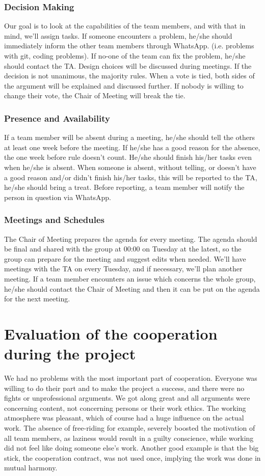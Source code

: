 \subsubsection{Decision Making}
Our goal is to look at the capabilities of the team members, and with that in mind, we'll assign tasks. If someone encounters a problem, he/she should immediately inform the other team members through WhatsApp. (i.e. problems with git, coding problems). If no-one of the team can fix the problem, he/she should contact the TA. Design choices will be discussed during meetings. If the decision is not unanimous, the majority rules. When a vote is tied, both sides of the argument will be explained and discussed further. If nobody is willing to change their vote, the Chair of Meeting will break the tie.

\subsubsection{Presence and Availability}
If a team member will be absent during a meeting, he/she should tell the others at least one week before the meeting. If he/she has a good reason for the absence, the one week before rule doesn't count. He/she should finish his/her tasks even when he/she is absent. When someone is absent, without telling, or doesn't have a good reason and/or didn't finish his/her tasks, this will be reported to the TA, he/she should bring a treat. Before reporting, a team member will notify the person in question via WhatsApp.
\subsubsection{Meetings and Schedules}
The Chair of Meeting prepares the agenda for every meeting.
The agenda should be final and shared with the group at 00:00 on Tuesday at the latest, so the group can prepare for the meeting and suggest edits when needed.
We'll have meetings with the TA on every Tuesday, and if necessary, we'll plan another meeting. If a team member encounters an issue which concerns the whole group, he/she should contact the Chair of Meeting and then it can be put on the agenda for the next meeting.

\section{Evaluation of the cooperation during the project}
We had no problems with the most important part of cooperation. Everyone was willing to do their part and to make the project a success, and there were no fights or unprofessional arguments. We got along great and all arguments were concerning content, not concerning persons or their work ethics. The working atmosphere was pleasant, which of course had a huge influence on the actual work. The absence of free-riding for example, severely boosted the motivation of all team members, as laziness would result in a guilty conscience, while working did not feel like doing someone else's work. Another good example is that the big stick, the cooperation contract, was not used once, implying the work was done in mutual harmony.

